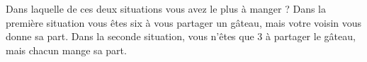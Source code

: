 
\begin{exercice}\label{exo2smath-0100}

Dans laquelle de ces deux situations vous avez le plus à manger ? Dans la première situation vous êtes six à vous partager un gâteau, mais votre voisin vous donne sa part. Dans la seconde situation, vous n'êtes que \( 3\) à partager le gâteau, mais chacun mange sa part.

\end{exercice}
